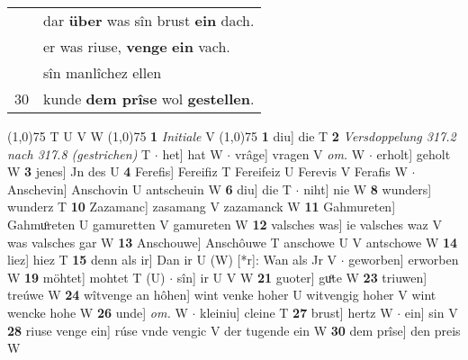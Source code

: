 \documentclass[8pt,a4paper,notitlepage]{article}
\begin{document}
\begin{table}[ht]
\begin{minipage}[t]{0.5\linewidth}
\begin{tabular}{rl}
 & dar \textbf{über} was sîn brust \textbf{ein} dach.\\ 
 & er was riuse, \textbf{venge} \textbf{ein} vach.\\ 
 & sîn manlîchez ellen\\ 
30 & kunde \textbf{dem prîse} wol \textbf{gestellen}.\\ 
\end{tabular}
\scriptsize
\line(1,0){75} \newline
T U V W \newline
\line(1,0){75} \newline
\textbf{1} \textit{Initiale} V  \newline
\line(1,0){75} \newline
\textbf{1} diu] die T \textbf{2} \textit{Versdoppelung 317.2 nach 317.8 (gestrichen)} T   $\cdot$ het] hat W  $\cdot$ vrâge] vragen V \textit{om.} W  $\cdot$ erholt] geholt W \textbf{3} jenes] Jn des U \textbf{4} Ferefis] Fereifiz T Fereifeiz U Ferevis V Ferafis W  $\cdot$ Anschevin] Anschovin U antscheuin W \textbf{6} diu] die T  $\cdot$ niht] nie W \textbf{8} wunders] wunderz T \textbf{10} Zazamanc] zasamang V zazamanck W \textbf{11} Gahmureten] Gahmuͦreten U gamuretten V gamureten W \textbf{12} valsches was] ie valsches waz V was valsches gar W \textbf{13} Anschouwe] Anschôuwe T anschowe U V antschowe W \textbf{14} liez] hiez T \textbf{15} denn als ir] Dan ir U (W) [*r]: Wan als Jr  V  $\cdot$ geworben] erworben W \textbf{19} möhtet] mohtet T (U)  $\cdot$ sîn] ir U V W \textbf{21} guoter] guͦte W \textbf{23} triuwen] treúwe W \textbf{24} wîtvenge an hôhen] wint venke hoher U witvengig hoher V wint wencke hohe W \textbf{26} unde] \textit{om.} W  $\cdot$ kleiniu] cleine T \textbf{27} brust] hertz W  $\cdot$ ein] sin V \textbf{28} riuse venge ein] rúse vnde vengic V der tugende ein W \textbf{30} dem prîse] den preis W \newline
\end{minipage}
\end{table}
\end{document}
